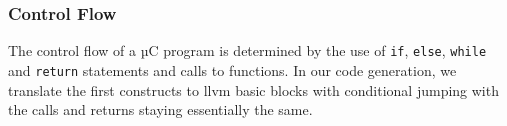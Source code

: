 \subsubsection{Control Flow}

The control flow of a µC program is determined by the use of \texttt{if}, \texttt{else}, \texttt{while} and \texttt{return} statements and calls to functions. In our code generation, we translate the first constructs to llvm basic blocks with conditional jumping with the calls and returns staying essentially the same.

